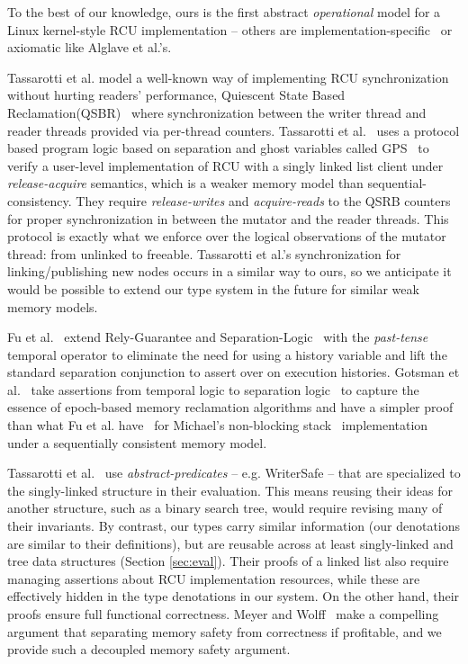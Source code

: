 To the best of our knowledge, ours is the first abstract \emph{operational} model for a Linux kernel-style RCU implementation -- others are implementation-specific~\cite{Mandrykin:2016:TDV:3001219.3001297} or axiomatic like Alglave et al.'s.

Tassarotti et al. model a well-known way of implementing RCU synchronization without hurting readers' performance, \textsf{Quiescent State Based Reclamation}(QSBR)~\cite{urcu_ieee} where synchronization between the writer thread and reader threads provided via per-thread counters. Tassarotti et al.~\cite{verrcu} uses a protocol based program logic based on separation and ghost variables called \textsf{GPS}~\cite{Turon:2014:GNW:2660193.2660243} to verify a user-level implementation of \textsf{RCU} with a singly linked list client under \emph{release-acquire} semantics, which is a weaker memory model than sequential-consistency. They require \textit{release-writes} and \textit{acquire-reads} to the QSRB counters for proper synchronization in between the mutator and the reader threads. This protocol is exactly what we enforce over the logical observations of the mutator thread: from \textsf{unlinked} to \textsf{freeable}. 
Tassarotti et al.'s synchronization for linking/publishing new nodes occurs in a similar way to ours, so we anticipate it would be possible to extend our type system in the future for similar weak memory models.

 Fu et al.~\cite{shao_temp} extend Rely-Guarantee and Separation-Logic~\cite{vafeiadis07,Feng:2007:RCS:1762174.1762193,Feng:2009:LRR:1480881.1480922} with the \textit{past-tense} temporal operator to eliminate the need for using a history variable and lift the standard separation conjunction to assert over on execution histories. Gotsman et al.~\cite{Gotsman:2013:VCM:2450268.2450289} take assertions from temporal logic to separation logic~\cite{vafeiadis07} to capture the essence of epoch-based memory reclamation algorithms and have a simpler proof than what Fu et al. have~\cite{shao_temp} for Michael's non-blocking stack~\cite{Michael:2004:HPS:987524.987595} implementation under a sequentially consistent memory model.

Tassarotti et al.~\cite{verrcu} use \textit{abstract-predicates} -- e.g. WriterSafe -- that are specialized to the singly-linked structure in their evaluation.  This means reusing their ideas for another structure, such as a binary search tree, would require revising many of their invariants.  By contrast, our types carry similar information (our denotations are similar to their definitions), but are reusable across at least singly-linked and tree data structures (Section \ref{sec:eval}). 
Their proofs of a linked list also require managing assertions about RCU implementation resources, while these are effectively hidden in the type denotations in our system.
On the other hand, their proofs ensure full functional correctness.  Meyer and Wolff~\cite{myr} make a compelling argument that separating memory safety from correctness if profitable, and we provide such a decoupled memory safety argument. 

